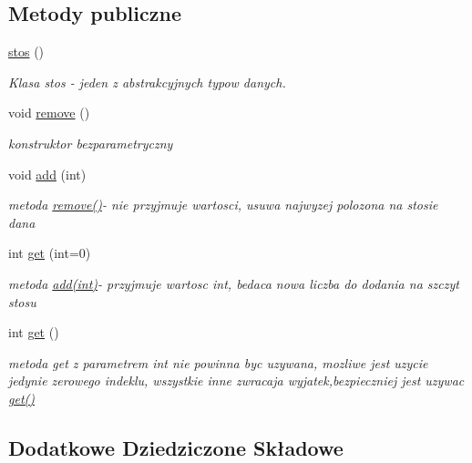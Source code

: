 \subsection*{Metody publiczne}
\begin{DoxyCompactItemize}
\item 
\hyperlink{classstos_afb387ac69250038334f6d8099b6a2421}{stos} ()
\begin{DoxyCompactList}\small\item\em Klasa stos -\/ jeden z abstrakcyjnych typow danych. \end{DoxyCompactList}\item 
void \hyperlink{classstos_a8af2cbfa1b680a7f045d3390a46a1748}{remove} ()
\begin{DoxyCompactList}\small\item\em konstruktor bezparametryczny \end{DoxyCompactList}\item 
void \hyperlink{classstos_add60398fb259ecc3f64cd43c9c74422f}{add} (int)
\begin{DoxyCompactList}\small\item\em metoda \hyperlink{classstos_a8af2cbfa1b680a7f045d3390a46a1748}{remove()}-\/ nie przyjmuje wartosci, usuwa najwyzej polozona na stosie dana \end{DoxyCompactList}\item 
int \hyperlink{classstos_a5d1b9f3ae3c00298385b555113a7467a}{get} (int=0)
\begin{DoxyCompactList}\small\item\em metoda \hyperlink{classstos_add60398fb259ecc3f64cd43c9c74422f}{add(int)}-\/ przyjmuje wartosc int, bedaca nowa liczba do dodania na szczyt stosu \end{DoxyCompactList}\item 
int \hyperlink{classstos_a84a6713aeafdd62ef6fe51fa11b7b6fa}{get} ()
\begin{DoxyCompactList}\small\item\em metoda get z parametrem int nie powinna byc uzywana, mozliwe jest uzycie jedynie zerowego indeklu, wszystkie inne zwracaja wyjatek,bezpieczniej jest uzywac \hyperlink{classstos_a84a6713aeafdd62ef6fe51fa11b7b6fa}{get()} \end{DoxyCompactList}\end{DoxyCompactItemize}
\subsection*{Dodatkowe Dziedziczone Składowe}


